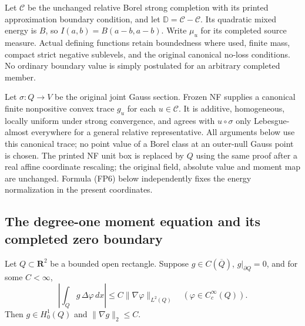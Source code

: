 Let $\mathscr C$ be the unchanged relative Borel strong completion
with its printed approximation boundary condition, and let
$\mathbb D=\mathscr C-\mathscr C$. Its quadratic mixed energy is
$B$, so $I(a,b)=B(a-b,a-b)$. Write $\mu_u$ for its completed
source measure. Actual defining functions retain boundedness where
used, finite mass, compact strict negative sublevels, and the original
canonical no-loss conditions. No ordinary boundary value is simply
postulated for an arbitrary completed member.

Let $\sigma:Q\to V$ be the original joint Gauss section. Frozen
NF supplies a canonical finite nonpositive convex trace $g_u$ for
each $u\in\mathscr C$. It is additive, homogeneous, locally uniform
under strong convergence, and agrees with $u\circ\sigma$ only
Lebesgue-almost everywhere for a general relative representative.
All arguments below use this canonical trace; no point value of a
Borel class at an outer-null Gauss point is chosen.
The printed NF unit box is replaced by $Q$ using the same proof
after a real affine coordinate rescaling; the original field,
absolute value and moment map are unchanged. Formula (FP6) below
independently fixes the energy normalization in the present coordinates.

\subsection{The degree-one moment equation and its completed zero boundary}

\begin{lemma}
Let $Q\subset\mathbf R^2$ be a bounded open rectangle. Suppose
$g\in C(\overline Q)$, $g|_{\partial Q}=0$, and for some $C<\infty$,
\[
 \left|\int_Qg\,\Delta\varphi\,dx\right|
                   \le C\|\nabla\varphi\|_{L^2(Q)}
                    \quad(\varphi\in C_c^\infty(Q)).
 \tag{FP2}
\]
Then $g\in H_0^1(Q)$ and $\|\nabla g\|_2\le C$.
\end{lemma}

